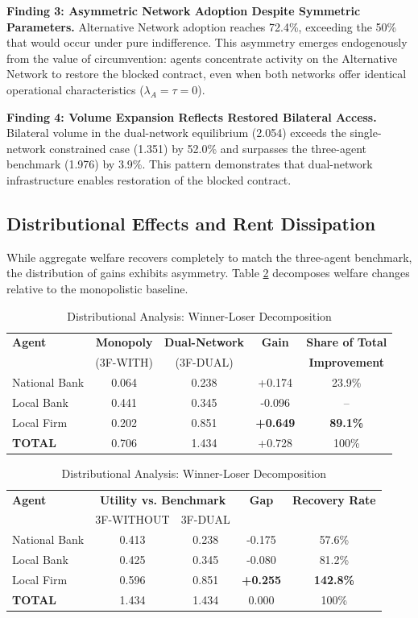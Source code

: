 \documentclass[12pt]{article}
\begin{document}
\textbf{Finding 3: Asymmetric Network Adoption Despite Symmetric Parameters.} Alternative Network adoption reaches 72.4\%, exceeding the 50\% that would occur under pure indifference. This asymmetry emerges endogenously from the value of circumvention: agents concentrate activity on the Alternative Network to restore the blocked contract, even when both networks offer identical operational characteristics ($\lambda_A = \tau = 0$).

\textbf{Finding 4: Volume Expansion Reflects Restored Bilateral Access.} Bilateral volume in the dual-network equilibrium (2.054) exceeds the single-network constrained case (1.351) by 52.0\% and surpasses the three-agent benchmark (1.976) by 3.9\%. This pattern demonstrates that dual-network infrastructure enables restoration of the blocked contract.

\subsection{Distributional Effects and Rent Dissipation}

While aggregate welfare recovers completely to match the three-agent benchmark, the distribution of gains exhibits asymmetry. Table \ref{tab:distributional_analysis} decomposes welfare changes relative to the monopolistic baseline.

\begin{table}[h]
\centering
\caption{Distributional Analysis: Winner-Loser Decomposition}
\label{tab:distributional_analysis}
\begin{tabular}{lcccc}
\toprule
\textbf{Agent} & \textbf{Monopoly} & \textbf{Dual-Network} & \textbf{Gain} & \textbf{Share of Total} \\
 & (3F-WITH) & (3F-DUAL) & & \textbf{Improvement} \\
\midrule
National Bank & 0.064 & 0.238 & +0.174 & 23.9\% \\
Local Bank & 0.441 & 0.345 & -0.096 & -- \\
Local Firm & 0.202 & 0.851 & \textbf{+0.649} & \textbf{89.1\%} \\
\midrule
\textbf{TOTAL} & 0.706 & 1.434 & +0.728 & 100\% \\
\bottomrule
\end{tabular}

\medskip

\begin{tabular}{lcccc}
\toprule
\textbf{Agent} & \multicolumn{2}{c}{\textbf{Utility vs. Benchmark}} & \textbf{Gap} & \textbf{Recovery Rate} \\
 & 3F-WITHOUT & 3F-DUAL & & \\
\midrule
National Bank & 0.413 & 0.238 & -0.175 & 57.6\% \\
Local Bank & 0.425 & 0.345 & -0.080 & 81.2\% \\
Local Firm & 0.596 & 0.851 & \textbf{+0.255} & \textbf{142.8\%} \\
\midrule
\textbf{TOTAL} & 1.434 & 1.434 & 0.000 & 100\% \\
\bottomrule
\end{tabular}
\end{table}
\end{document}
